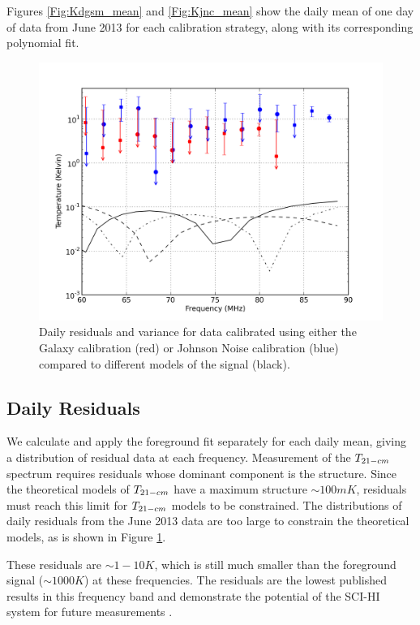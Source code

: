 Figures \ref{Fig:Kdgsm_mean} and \ref{Fig:Kjnc_mean} show the daily mean of one day of data from June 2013 for each calibration strategy, along with its corresponding polynomial fit. 

\begin{figure}[htb]
\begin{center}
\includegraphics[width=0.95\linewidth]{Data_analysis/figures/joint_log_means.png}
\caption{Daily residuals and variance for data calibrated using either the Galaxy calibration (red) or Johnson Noise calibration (blue) compared to different models of the \cm signal (black). }
\label{Fig:resid}
\end{center}
\end{figure}


\subsection{Daily Residuals}

We calculate and apply the foreground fit separately for each daily mean, giving a distribution of residual data at each frequency. Measurement of the $T_{21-cm}$ spectrum requires residuals whose dominant component is the \cm structure. Since the theoretical models of $T_{21-cm}$ have a maximum structure $\sim 100 mK$, residuals must reach this limit for $T_{21-cm}$ models to be constrained. The distributions of daily residuals from the June 2013 data are too large to constrain the theoretical models, as is shown in Figure \ref{Fig:resid}. 

These residuals are $\sim 1-10K$, which is still much smaller than the foreground signal ($\sim 1000K$) at these frequencies. The residuals are the lowest published results in this frequency band and demonstrate the potential of the SCI-HI system for future measurements \cite{Voytek_2014}. 


